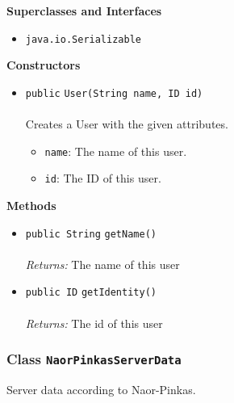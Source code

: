 \textbf{\sffamily Superclasses and Interfaces}
\begin{itemize}
\item \lstinline|java.io.Serializable|
\end{itemize}


\textbf{\sffamily Constructors}
\begin{itemize}
\item \lstinline|public| \lstinline|User|\lstinline|(String name, ID id)|\\ \\[-0.6em]
Creates a User with the given attributes.
\begin{itemize}
\item \lstinline|name|: The name of this user.
\item \lstinline|id|: The ID of this user.
\end{itemize}



\end{itemize}


\textbf{\sffamily Methods}
\begin{itemize}
\item \lstinline|public String| \lstinline|getName|\lstinline|()|\\ \\[-0.6em]
\emph{Returns:} The name of this user



\item \lstinline|public ID| \lstinline|getIdentity|\lstinline|()|\\ \\[-0.6em]
\emph{Returns:} The id of this user



\end{itemize}

\subsubsection{Class \lstinline|NaorPinkasServerData|}
Server data according to Naor-Pinkas. \\
\noindent\begin{minipage}[t]{5cm}
\vspace{0.3em}
\hspace*{2em}
\vspace{0.3em}
\end{minipage}



